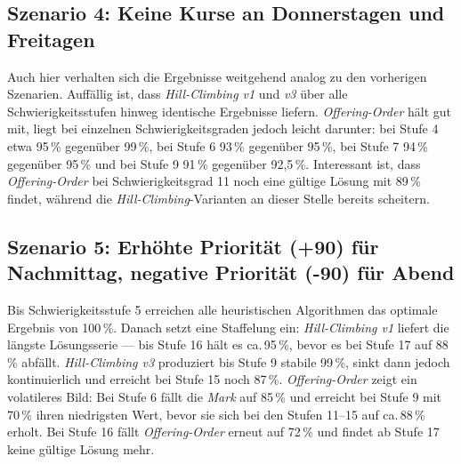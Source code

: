 \vspace{1cm}

\newpage


\subsection{Szenario 4: Keine Kurse an Donnerstagen und Freitagen}

Auch hier verhalten sich die Ergebnisse weitgehend analog zu den vorherigen Szenarien.
Auffällig ist, dass \textit{Hill-Climbing v1} und \textit{v3} über alle Schwierigkeitsstufen
hinweg identische Ergebnisse liefern. \textit{Offering-Order} hält gut mit, liegt bei
einzelnen Schwierigkeitsgraden jedoch leicht darunter: bei Stufe 4 etwa 95\,\% gegenüber
99\,\%, bei Stufe 6 93\,\% gegenüber 95\,\%, bei Stufe 7 94\,\% gegenüber 95\,\% und bei
Stufe 9 91\,\% gegenüber 92{,}5\,\%. Interessant ist, dass \textit{Offering-Order} bei
Schwierigkeitsgrad 11 noch eine gültige Lösung mit 89\,\% findet, während die
\textit{Hill-Climbing}-Varianten an dieser Stelle bereits scheitern.

\vspace{1cm}

\newpage


\subsection{Szenario 5: Erhöhte Priorität (+90) für Nachmittag, negative Priorität (-90) für Abend}

Bis Schwierigkeitsstufe 5 erreichen alle heuristischen Algorithmen das optimale Ergebnis von
100\,\%. Danach setzt eine Staffelung ein: \textit{Hill-Climbing v1} liefert die längste
Lösungsserie --- bis Stufe 16 hält es ca.\,95\,\%, bevor es bei Stufe 17 auf 88\,\% abfällt.
\textit{Hill-Climbing v3} produziert bis Stufe 9 stabile 99\,\%, sinkt dann jedoch
kontinuierlich und erreicht bei Stufe 15 noch 87\,\%. \textit{Offering-Order} zeigt ein
volatileres Bild: Bei Stufe 6 fällt die \textit{Mark} auf 85\,\% und erreicht bei Stufe 9 mit 70\,\%
ihren niedrigsten Wert, bevor sie sich bei den Stufen 11--15 auf ca.\,88\,\% erholt. Bei Stufe
16 fällt \textit{Offering-Order} erneut auf 72\,\% und findet ab Stufe 17 keine gültige Lösung
mehr.

